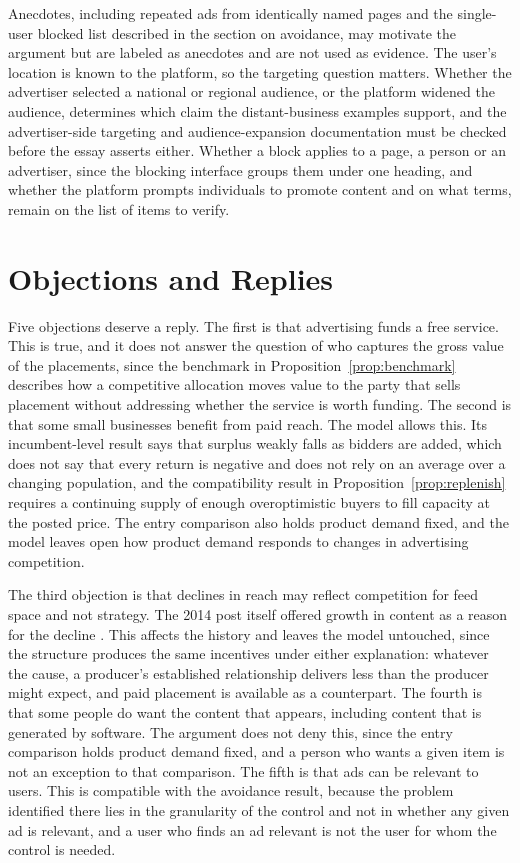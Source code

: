 \documentclass[11pt]{article}
\theoremstyle{definition}
\begin{document}
Anecdotes, including repeated ads from identically named pages and the single-user blocked list described in the section on avoidance, may motivate the argument but are labeled as anecdotes and are not used as evidence. The user's location is known to the platform, so the targeting question matters. Whether the advertiser selected a national or regional audience, or the platform widened the audience, determines which claim the distant-business examples support, and the advertiser-side targeting and audience-expansion documentation must be checked before the essay asserts either. Whether a block applies to a page, a person or an advertiser, since the blocking interface groups them under one heading, and whether the platform prompts individuals to promote content and on what terms, remain on the list of items to verify.

\section{Objections and Replies}

Five objections deserve a reply. The first is that advertising funds a free service. This is true, and it does not answer the question of who captures the gross value of the placements, since the benchmark in Proposition~\ref{prop:benchmark} describes how a competitive allocation moves value to the party that sells placement without addressing whether the service is worth funding. The second is that some small businesses benefit from paid reach. The model allows this. Its incumbent-level result says that surplus weakly falls as bidders are added, which does not say that every return is negative and does not rely on an average over a changing population, and the compatibility result in Proposition~\ref{prop:replenish} requires a continuing supply of enough overoptimistic buyers to fill capacity at the posted price. The entry comparison also holds product demand fixed, and the model leaves open how product demand responds to changes in advertising competition.

The third objection is that declines in reach may reflect competition for feed space and not strategy. The 2014 post itself offered growth in content as a reason for the decline \cite{boland2014}. This affects the history and leaves the model untouched, since the structure produces the same incentives under either explanation: whatever the cause, a producer's established relationship delivers less than the producer might expect, and paid placement is available as a counterpart. The fourth is that some people do want the content that appears, including content that is generated by software. The argument does not deny this, since the entry comparison holds product demand fixed, and a person who wants a given item is not an exception to that comparison. The fifth is that ads can be relevant to users. This is compatible with the avoidance result, because the problem identified there lies in the granularity of the control and not in whether any given ad is relevant, and a user who finds an ad relevant is not the user for whom the control is needed.
\end{document}
